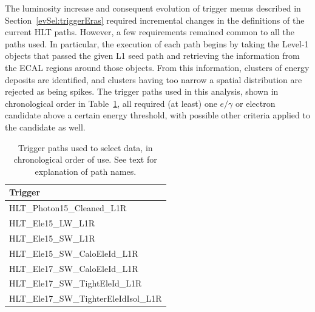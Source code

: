 

The luminosity increase and consequent evolution of trigger menus 
described in Section~\ref{evSel:triggerEras} required incremental changes 
in the definitions of the current HLT paths.  
However, a few requirements remained common to all the paths used.  
In particular, the execution of each path begins by taking 
the Level-1 objects that passed the given L1 seed path 
and retrieving the information from the ECAL regions %
around those objects.  
From this information, 
clusters of energy deposits are identified, 
and clusters having too narrow a spatial distribution are 
rejected as being spikes.  
The trigger paths used in this analysis, 
shown in chronological order in Table~\ref{TableTriggerPaths}, 
all required (at least) one 
$e/\gamma$ or electron candidate above a certain energy threshold, 
with possible other criteria applied to the candidate as well.%

\begin{table}[htbp]
  \begin{center}
    \caption{\fixspacing Trigger paths used to select data, 
    in chronological order of use. 
    See text for explanation of path names.  
    }
    \label{TableTriggerPaths}
    \begin{tabular}[]{ | l | }
      \hline
      Trigger  \\ \hline \hline
      HLT\_Photon15\_Cleaned\_L1R  \\ \hline
      HLT\_Ele15\_LW\_L1R  \\ \hline
      HLT\_Ele15\_SW\_L1R  \\ \hline
      HLT\_Ele15\_SW\_CaloEleId\_L1R  \\ \hline
      HLT\_Ele17\_SW\_CaloEleId\_L1R  \\ \hline
      HLT\_Ele17\_SW\_TightEleId\_L1R  \\ \hline
      HLT\_Ele17\_SW\_TighterEleIdIsol\_L1R  \\ \hline
    \end{tabular}
  \end{center}
\end{table}

